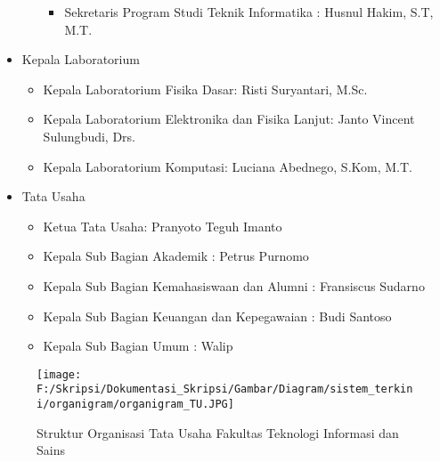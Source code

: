 \begin{itemize}
\begin{itemize}
\begin{itemize}
			\item Sekretaris Program Studi Teknik Informatika : Husnul Hakim, S.T, M.T.
		\end{itemize}
	\end{itemize}
	\item Kepala Laboratorium
	\begin{itemize}
		\item Kepala Laboratorium Fisika Dasar: Risti Suryantari, M.Sc.
		\item Kepala Laboratorium Elektronika dan Fisika Lanjut: Janto Vincent Sulungbudi, Drs.
		\item Kepala Laboratorium Komputasi: Luciana Abednego, S.Kom, M.T.
	\end{itemize}
	\item Tata Usaha
	\begin{itemize}
		\item Ketua Tata Usaha: Pranyoto Teguh Imanto
		\item Kepala Sub Bagian Akademik : Petrus Purnomo
		\item Kepala Sub Bagian Kemahasiswaan dan Alumni : Fransiscus Sudarno
		\item Kepala Sub Bagian Keuangan dan Kepegawaian : Budi Santoso
		\item Kepala Sub Bagian Umum : Walip
	\end{itemize}
\end{itemize}


\begin{figure}[H]
	\centering
		\texttt{[image: F:/Skripsi/Dokumentasi\_Skripsi/Gambar/Diagram/sistem\_terkini/organigram/organigram\_TU.JPG]}
	\caption{Struktur Organisasi Tata Usaha Fakultas Teknologi Informasi dan Sains}
	\label{fig:lampiran_organigram_TU}
\end{figure}